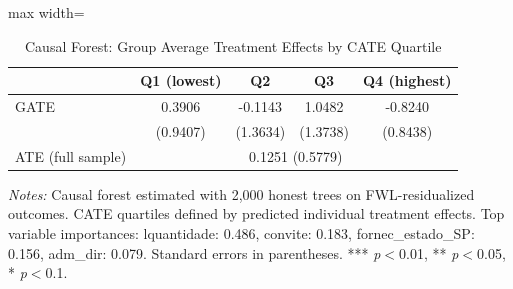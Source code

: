 \begin{table}[htbp]
\centering
\caption{Causal Forest: Group Average Treatment Effects by CATE Quartile}
\label{tab:cforest}
\begin{adjustbox}{max width=\textwidth}
\begin{threeparttable}
\small
\begin{tabular}{lcccc}
\toprule
 & Q1 (lowest) & Q2 & Q3 & Q4 (highest) \\
\midrule
GATE & 0.3906 & -0.1143 & 1.0482 & -0.8240 \\
 & (0.9407) & (1.3634) & (1.3738) & (0.8438) \\
\midrule
ATE (full sample) & \multicolumn{4}{c}{0.1251 (0.5779)} \\
\bottomrule
\end{tabular}
\begin{tablenotes}
\small
\item \textit{Notes:} Causal forest estimated with 2,000 honest trees on FWL-residualized outcomes.
CATE quartiles defined by predicted individual treatment effects.
Top variable importances: lquantidade: 0.486, convite: 0.183, fornec\_estado\_SP: 0.156, adm\_dir: 0.079.
Standard errors in parentheses.
*** \textit{p}$<$0.01, ** \textit{p}$<$0.05, * \textit{p}$<$0.1.
\end{tablenotes}
\end{threeparttable}
\end{adjustbox}
\end{table}
